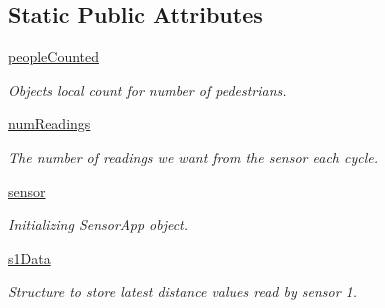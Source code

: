 \subsection*{Static Public Attributes}
\begin{DoxyCompactItemize}
\item 
\mbox{\label{class_data_filter_1_1_data_filter_a60f284188457f923012772e742b80fea}} 
\mbox{\hyperlink{class_data_filter_1_1_data_filter_a60f284188457f923012772e742b80fea}{people\+Counted}}
\begin{DoxyCompactList}\small\item\em Object\textquotesingle{}s local count for number of pedestrians. \end{DoxyCompactList}\item 
\mbox{\label{class_data_filter_1_1_data_filter_acf552ffa41362c83cb122789fe773329}} 
\mbox{\hyperlink{class_data_filter_1_1_data_filter_acf552ffa41362c83cb122789fe773329}{num\+Readings}}
\begin{DoxyCompactList}\small\item\em The number of readings we want from the sensor each cycle. \end{DoxyCompactList}\item 
\mbox{\label{class_data_filter_1_1_data_filter_a2f9315bfe6ab0a7b74bcb98310b2f8d2}} 
\mbox{\hyperlink{class_data_filter_1_1_data_filter_a2f9315bfe6ab0a7b74bcb98310b2f8d2}{sensor}}
\begin{DoxyCompactList}\small\item\em Initializing Sensor\+App object. \end{DoxyCompactList}\item 
\mbox{\label{class_data_filter_1_1_data_filter_a2d139273025a1cb06007c3a5b43f084e}} 
\mbox{\hyperlink{class_data_filter_1_1_data_filter_a2d139273025a1cb06007c3a5b43f084e}{s1\+Data}}
\begin{DoxyCompactList}\small\item\em Structure to store latest distance values read by sensor 1. \end{DoxyCompactList}\item 
\mbox{\label{class_data_filter_1_1_data_filter_a8c4508633e4146d7552e7cc7a8329717}} 

\end{DoxyCompactItemize}
